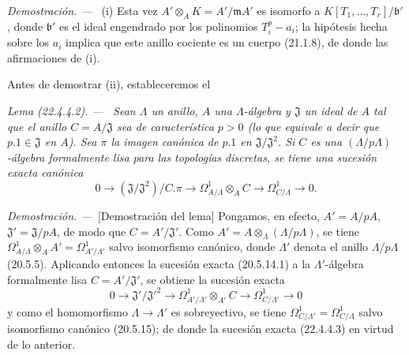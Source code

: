 \documentclass[10pt,oneside]{book}
\makeatletter
\newcommand{\setmanualcurrentlabel}[1]{\def\@currentlabel{#1}}
\newenvironment{lemma}[1][]{%
  \setmanualcurrentlabel{#1}\par\medskip\noindent\itshape Lema (#1). ---\ }{\par}
\newenvironment{proof}{%
  \par\medskip\noindent\textit{Demostración. ---\ }}{\par}
\providecommand{\setmin}{-}%
\makeatother
\begin{document}
\begin{proof}
(i) Esta vez $A'\otimes_AK=A'/\mathfrak mA'$ es isomorfo a
$K[T_1,\ldots,T_r]/\mathfrak b'$, donde $\mathfrak b'$ es el ideal engendrado
por los polinomios $T_i^p\setmin a_i$; la hipótesis hecha sobre los $a_i$ implica que
este anillo cociente es un cuerpo (21.1.8), de donde las afirmaciones de (i).

Antes de demostrar (ii), estableceremos el

\begin{lemma}[22.4.4.2]
\label{0.22.4.4.2-es}
Sean $\Lambda$ un anillo, $A$ una $\Lambda$-álgebra y $\mathfrak J$ un
ideal de $A$ tal que el anillo $C=A/\mathfrak J$ sea de característica
$p>0$ (lo que equivale a decir que $p.1\in\mathfrak J$ en $A$). Sea
$\pi$ la imagen canónica de $p.1$ en
$\mathfrak J/\mathfrak J^2$. Si $C$ es una $(\Lambda/p\Lambda)$-álgebra
formalmente lisa para las topologías discretas, se tiene una sucesión exacta
canónica
\begin{equation}
\label{0.22.4.4.3-es}
  0\longrightarrow(\mathfrak J/\mathfrak J^2)/C.\pi
  \longrightarrow\Omega^1_{A/\Lambda}\otimes_AC
  \longrightarrow\Omega^1_{C/\Lambda}\longrightarrow0.
  \tag{22.4.4.3}
\end{equation}
\end{lemma}

\begin{proof}[Demostración del lema]
Pongamos, en efecto, $A'=A/pA$, $\mathfrak J'=\mathfrak J/pA$, de modo que
$C=A'/\mathfrak J'$. Como
$A'=A\otimes_\Lambda(\Lambda/p\Lambda)$, se tiene
$\Omega^1_{A/\Lambda}\otimes_AA'=\Omega^1_{A'/\Lambda'}$ salvo
isomorfismo canónico, donde $\Lambda'$ denota el anillo
$\Lambda/p\Lambda$ (20.5.5). Aplicando entonces la sucesión exacta (20.5.14.1) a
la $\Lambda'$-álgebra formalmente lisa $C=A'/\mathfrak J'$, se obtiene la
sucesión exacta
\[
  0\longrightarrow\mathfrak J'/\mathfrak J'^2
  \longrightarrow\Omega^1_{A'/\Lambda'}\otimes_{A'}C
  \longrightarrow\Omega^1_{C/\Lambda'}\longrightarrow0
\]
y como el homomorfismo $\Lambda\to\Lambda'$ es sobreyectivo, se tiene
$\Omega^1_{C/\Lambda'}=\Omega^1_{C/\Lambda}$ salvo isomorfismo canónico
(20.5.15); de donde la sucesión exacta (22.4.4.3) en virtud de lo anterior.
\end{proof}


\end{proof}
\end{document}
